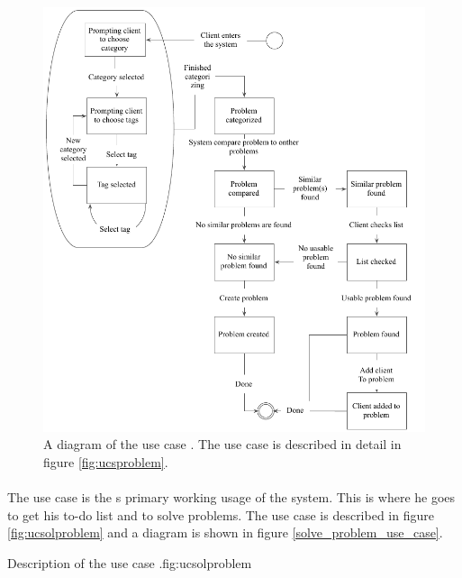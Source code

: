 \begin{figure}[htbp]
\begin{center}
 \includegraphics[scale=1]{input/application_domain_analysis/submit_problem_use_case}
\caption{A diagram of the use case \ucsproblem{}. The use case is described in detail in figure \ref{fig:ucsproblem}.}
\label{fig:submit_problem_use_case}
\end{center}
\end{figure}



\paragraph{\ucsolproblem{}} The use case \ucsolproblem{} is the \astaff{}s primary working usage of the system. This is where he goes to get his to-do list and to solve problems. The use case is described in figure \ref{fig:ucsolproblem} and a diagram is shown in figure \ref{solve_problem_use_case}.

\begin{sadlist}[h]{\ucsproblem[c]}{Description of the use case \ucsolproblem{}.}{fig:ucsolproblem}
\end{sadlist}

